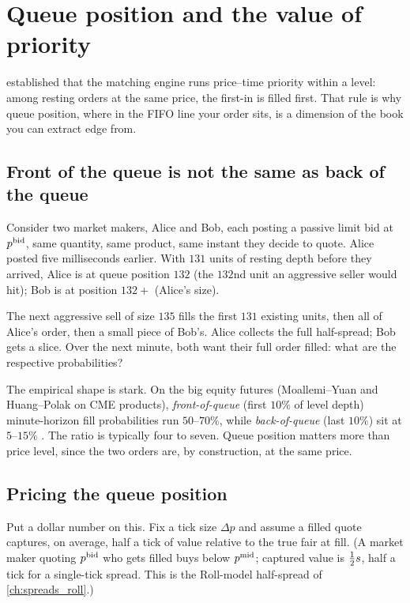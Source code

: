 \section{Queue position and the value of priority}
\label{sec:queue}

 established that the matching engine runs
price--time priority within a level: among resting orders at the
same price, the first-in is filled first. That rule is why queue
position, where in the FIFO line your order sits, is a
dimension of the book you can extract edge from.

\subsection{Front of the queue is not the same as back of the queue}

Consider two market makers, Alice and Bob, each posting a passive
limit bid at $p^{\mathrm{bid}}$, same quantity, same product, same instant
they decide to quote. Alice posted five milliseconds earlier.
With $131$ units of resting depth before they arrived, Alice is
at queue position $132$ (the $132$nd unit an aggressive seller
would hit); Bob is at position $132 + $ (Alice's size).

The next aggressive sell of size $135$ fills the first $131$
existing units, then all of Alice's order, then a small piece of
Bob's. Alice collects the full half-spread; Bob gets a slice.
Over the next minute, both want their full order filled: what
are the respective probabilities?

The empirical shape is stark. On the big equity futures
(Moallemi--Yuan and Huang--Polak on CME products),
\emph{front-of-queue} (first $10\%$ of level depth) minute-horizon
fill probabilities run $50$--$70\%$, while \emph{back-of-queue}
(last $10\%$) sit at $5$--$15\%$ \citeBouchaud. The ratio is
typically four to seven. Queue position matters more than price
level, since the two orders are, by construction, at the same
price.

\subsection{Pricing the queue position}

Put a dollar number on this. Fix a tick size $\Delta p$ and
assume a filled quote captures, on average, half a tick of value
relative to the true fair at fill. (A market maker quoting
$p^{\mathrm{bid}}$ who gets filled buys below $p^{\mathrm{mid}}$; captured value is
$\tfrac{1}{2}s$, half a tick for a single-tick spread.
This is the Roll-model half-spread of \cref{ch:spreads_roll}.)

